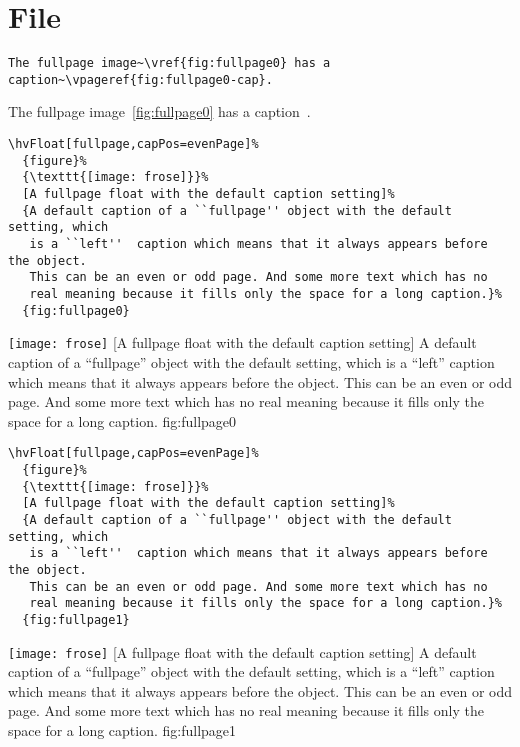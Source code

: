 \documentclass{scrartcl}
\begin{document}
\blinddocument

\section{File \texttt{\jobname}}

\begin{lstlisting}
The fullpage image~\vref{fig:fullpage0} has a caption~\vpageref{fig:fullpage0-cap}.
\end{lstlisting}

The fullpage image~\vref{fig:fullpage0} has a caption~.

\begin{lstlisting}
\hvFloat[fullpage,capPos=evenPage]%
  {figure}%
  {\texttt{[image: frose]}}%
  [A fullpage float with the default caption setting]%
  {A default caption of a ``fullpage'' object with the default setting, which
   is a ``left''  caption which means that it always appears before the object.
   This can be an even or odd page. And some more text which has no
   real meaning because it fills only the space for a long caption.}%
  {fig:fullpage0}
\end{lstlisting}


\Float[capPos=evenPage]
%
  {\texttt{[image: frose]}}%
  [A fullpage float with the default caption setting]%
  {A default caption of a ``fullpage'' object with the default setting, which
   is a ``left''  caption which means that it always appears before the object.
   This can be an even or odd page. And some more text which has no
   real meaning because it fills only the space for a long caption.}%
  {fig:fullpage0}

\Blindtext

\begin{lstlisting}
\hvFloat[fullpage,capPos=evenPage]%
  {figure}%
  {\texttt{[image: frose]}}%
  [A fullpage float with the default caption setting]%
  {A default caption of a ``fullpage'' object with the default setting, which
   is a ``left''  caption which means that it always appears before the object.
   This can be an even or odd page. And some more text which has no
   real meaning because it fills only the space for a long caption.}%
  {fig:fullpage1}
\end{lstlisting}


\Float[capPos=evenPage]
%
  {\texttt{[image: frose]}}%
  [A fullpage float with the default caption setting]%
  {A default caption of a ``fullpage'' object with the default setting, which
   is a ``left''  caption which means that it always appears before the object.
   This can be an even or odd page. And some more text which has no
   real meaning because it fills only the space for a long caption.}%
  {fig:fullpage1}

\blinddocument
\Blindtext
\end{document}

